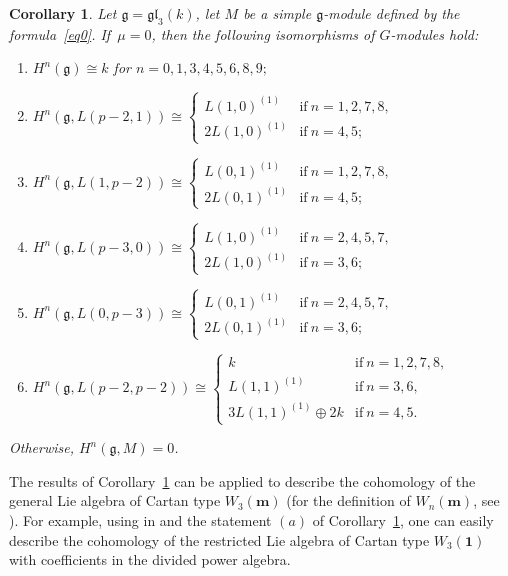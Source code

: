 \documentclass[10pt,a4paper]{amsart}
\numberwithin{equation}{section}
\newtheorem{Corollary}[Theorem]{Corollary}
\begin{document}
\begin{Corollary}\label{c1}
Let $\mathfrak{g}=\mathfrak{gl}_3(k)$, let $M$ be a simple $\mathfrak{g}$-module defined by the formula~\eqref{eq0}. If~$\mu=0$, then the following isomorphisms of $G$-modules hold:

\begin{enumerate}\itemsep=0pt

\item[$(a)$] $H^n(\mathfrak{g})\cong k$ for $n=0,1,3,4,5,6,8,9;$

\item[$(b)$] $H^n(\mathfrak{g},L(p-2,1))\cong
\begin{cases}
L(1,0)^{(1)}&\text{if}\ n=1,2,7,8,
\\
2L(1,0)^{(1)}&\text{if}\ n=4,5;
\end{cases}$

\item[$(c)$] $H^n(\mathfrak{g},L(1,p-2))\cong
\begin{cases}
L(0,1)^{(1)}&\text{if}\ n=1,2,7,8,
\\
2L(0,1)^{(1)}&\text{if}\ n=4,5;
\end{cases}$

\item[$(d)$] $H^n(\mathfrak{g},L(p-3,0))\cong
\begin{cases}
L(1,0)^{(1)}&\text{if}\ n=2,4,5,7,
\\
2L(1,0)^{(1)}&\text{if}\ n=3,6;
\end{cases}$

\item[$(e)$] $H^n(\mathfrak{g},L(0,p-3))\cong
\begin{cases}
L(0,1)^{(1)}&\text{if}\ n=2,4,5,7,
\\
2L(0,1)^{(1)}&\text{if}\ n=3,6;
\end{cases}$

\item[$(f)$] $H^n(\mathfrak{g},L(p-2,p-2))\cong
\begin{cases}
k&\text{if} \ n=1,2,7,8,\\
L(1,1)^{(1)}&\text{if}\ n=3,6,\\
3L(1,1)^{(1)}\oplus 2k&\text{if}\ n=4,5.
\end{cases}$
\end{enumerate}
Otherwise, $H^n(\mathfrak{g},M)=0$.
\end{Corollary}

The results of Corollary~\ref{c1} can be applied to describe the cohomology of the general Lie algebra of Cartan type $W_3(\mathbf{m})$ (for the definition of $W_n(\mathbf{m})$, see \cite[Section~1.3]{IT21}). For example, using in \cite[Theorem~0.2]{BY17} and the statement $(a)$ of Corollary~\ref{c1}, one can easily describe the cohomology of the restricted Lie algebra of Cartan type $W_3(\mathbf{1})$ with coefficients in the divided power algebra.
\end{document}
